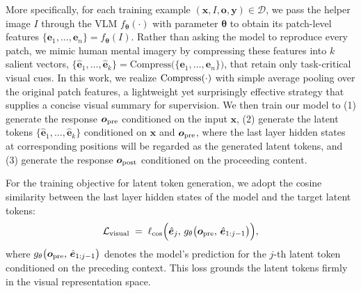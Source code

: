 More specifically, for each training example $(\bm x, I, \bm o, \bm y)\in \mathcal{D}$, we pass the helper image $I$ through the VLM $f_{\bm \theta}(\cdot)$ with parameter $\bm \theta$ to obtain its patch-level features $\{\bm e_{1},\dots,\bm e_{n}\}=f_{\bm \theta}(I)$. Rather than asking the model to reproduce every patch, we mimic human mental imagery by compressing these features into $k$ salient vectors, $\{\hat{\bm e}_{1},\dots ,\hat{\bm{e}}_{k}\}=\mathrm{Compress}\bigl(\{\bm e_{1},\dots ,\bm e_{n}\}\bigr)$, that retain only task-critical visual cues. In this work, we realize ${\rm Compress}(\cdot)$ with simple average pooling over the original patch features, a lightweight yet surprisingly effective strategy that supplies a concise visual summary for supervision. We then train our model to
(1) generate the response $\bm o_{\rm pre}$ conditioned on the input $\bm x$,
(2) generate the latent tokens $\{\hat{\bm e}_{1},\dots ,\hat{\bm{e}}_{k}\}$ conditioned on $\bm x$ and $\bm o_{\rm pre}$, where the last layer hidden states at corresponding positions will be regarded as the generated latent tokens,
and (3) generate the response $\bm o_{\rm post}$ conditioned on the proceeding content.



For the training objective for latent token generation, we adopt the cosine similarity between the last layer hidden states of the model and the target latent tokens:
\begin{equation}
\mathcal{L}_{\rm visual}\;=\;
\ell_{\cos}\Bigl(\hat{\bm{e}}_{j},\,g_{\theta}\bigl(\bm o_{\rm pre},\,\hat{\bm{e}}_{1:j-1}\bigr)\Bigr),
\end{equation}
where $g_{\theta}\bigl(\bm o_{\rm pre},\,\hat{\bm{e}}_{1:j-1}\bigr)$ denotes the model's prediction for the $j$-th latent token conditioned on the preceding context. This loss grounds the latent tokens firmly in the visual representation space.



